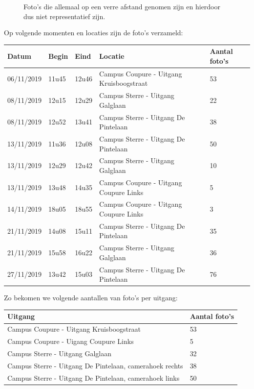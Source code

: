 \begin{figure}[h!]
\begin{subfigure}[b]{0.45\linewidth}
	\end{subfigure}
	\caption{Foto's die allemaal op een verre afstand genomen zijn en hierdoor dus niet representatief zijn.}
	\label{fig:onlyfar}
\end{figure}

Op volgende momenten en locaties zijn de foto's verzameld:

\begin{table}[h]
\centering
\begin{tabular}{l|l|l|l|l}
	Datum 		& Begin & Eind	& Locatie	& Aantal foto's \\ \hline
	06/11/2019	& 11u45 & 12u46	& Campus Coupure - Uitgang Kruisboogstraat	& 53	\\
	08/11/2019	& 12u15 & 12u29	& Campus Sterre - Uitgang Galglaan	& 22	\\
	08/11/2019	& 12u52 & 13u41	& Campus Sterre - Uitgang De Pintelaan	& 38	\\
	13/11/2019	& 11u36 & 12u08	& Campus Sterre - Uitgang De Pintelaan	& 50	\\
	13/11/2019	& 12u29 & 12u42	& Campus Sterre - Uitgang Galglaan	& 10	\\
	13/11/2019	& 13u48 & 14u35	& Campus Coupure - Uitgang Coupure Links	& 5	\\
	14/11/2019	& 18u05 & 18u55	& Campus Coupure - Uitgang Coupure Links	& 3	\\
	21/11/2019	& 14u08 & 15u11	& Campus Sterre - Uitgang De Pintelaan	& 35	\\
	21/11/2019	& 15u58 & 16u22	& Campus Sterre - Uitgang Galglaan	& 36	\\
	27/11/2019	& 13u42 & 15u03	& Campus Sterre - Uitgang De Pintelaan	& 76	\\
\end{tabular}
\end{table}

Zo bekomen we volgende aantallen van foto's per uitgang:
\begin{table}[h]
	\centering
	\begin{tabular}{l|l}
		Uitgang	& Aantal foto's \\ \hline
		Campus Coupure - Uitgang Kruisboogstraat	& 53\\
		Campus Coupure - Uigang Coupure Links	& 5\\
		Campus Sterre - Uitgang Galglaan	& 32\\
		Campus Sterre - Uitgang De Pintelaan, camerahoek rechts	& 38\\
		Campus Sterre - Uitgang De Pintelaan, camerahoek links	& 50\\
	\end{tabular}
\end{table}

